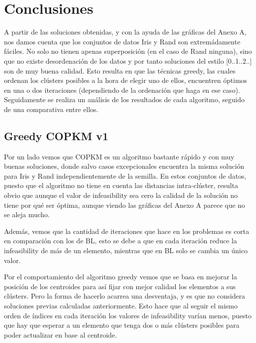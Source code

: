 \section{Conclusiones}


A partir de las soluciones obtenidas, y con la ayuda de las gráficas del Anexo A, nos damos cuenta que los conjuntos de datos Iris y Rand son extremádamente fáciles. No solo no tienen apenas superposición (en el caso de Rand ninguna), sino que no existe desordenación de los datos y por tanto soluciones del estilo [0..1..2..] son de muy buena calidad. Esto resulta en que las técnicas greedy, las cuales ordenan los clústers posibles a la hora de elegir uno de ellos, encuentren óptimos en una o dos iteraciones (dependiendo de la ordenación que haga en ese caso). \\

Seguidamente se realiza un análisis de los resultados de cada algoritmo, seguido de una comparativa entre ellos.

\subsection{Greedy COPKM v1}

Por un lado vemos que COPKM es un algoritmo bastante rápido y con muy buenas soluciones, donde salvo casos excepcionales encuentra la misma solución para Iris y Rand independientemente de la semilla.
En estos conjuntos de datos, puesto que el algoritmo no tiene en cuenta las distancias intra-clúster, resulta obvio que aunque el valor de infeasibility sea cero la calidad de la solución no tiene por qué ser óptima, aunque viendo las gráficas del Anexo A parece que no se aleja mucho.

Además, vemos que la cantidad de iteraciones que hace en los problemas es corta en comparación con los de BL, esto se debe a que en cada iteración reduce la infeasibility de más de un elemento, mientras que en BL solo se cambia un único valor.

Por el comportamiento del algoritmo greedy vemos que se basa en mejorar la posición de los centroides para así fijar con mejor calidad los elementos a sus clústers. Pero la forma de hacerlo acarrea una desventaja, y es que no considera soluciones previas calculadas anteriormente. Esto hace que al seguir el mismo orden de índices en cada iteración los valores de infeasibility varían menos, puesto que hay que esperar a un elemento que tenga dos o más clústers posibles para poder actualizar en base al centroide.

